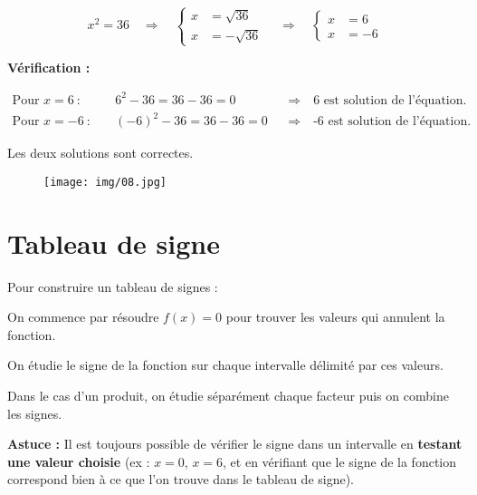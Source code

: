 \documentclass[a4paper,12pt]{article}
\begin{document}
\begin{tcolorbox}[colback=blue!5!white, colframe=blue!75!black, title=Méthode, breakable]
\[
x^2 = 36 \quad \Rightarrow \quad
\left\{
\begin{aligned}
x &= \sqrt{36} \\
x &= -\sqrt{36}
\end{aligned}
\right.
\quad \Rightarrow \quad
\left\{
\begin{aligned}
x &= 6 \\
x &= -6
\end{aligned}
\right.
\]
    
    \textbf{Vérification :}
    
    \begin{align*}
        \text{Pour } x = 6\ :\quad & 6^2 - 36 = 36 - 36 = 0 &&\Rightarrow\quad \text{6 est solution de l'équation.} \\
        \text{Pour } x = -6\ :\quad & (-6)^2 - 36 = 36 - 36 = 0 &&\Rightarrow\quad \text{-6 est solution de l'équation.}
    \end{align*}
    
    Les deux solutions sont correctes.
    
    \end{tcolorbox}
    
    \begin{figure}[H]
        \centering
        \texttt{[image: img/08.jpg]}
      \end{figure}

\section*{Tableau de signe}

\begin{tcolorbox}[colback=blue!5!white, colframe=blue!75!black, title=Méthode – Tableaux de signes]
    Pour construire un tableau de signes :
    \begin{compactitem}
        \item On commence par résoudre $f(x) = 0$ pour trouver les valeurs qui annulent la fonction.
        \item On étudie le signe de la fonction sur chaque intervalle délimité par ces valeurs.
        \item Dans le cas d'un produit, on étudie séparément chaque facteur puis on combine les signes.
    \end{compactitem}
    
    \textbf{Astuce :} Il est toujours possible de vérifier le signe dans un intervalle en \textbf{testant une valeur choisie} (ex : \(x = 0\), \(x = 6\), et en vérifiant que le signe de la fonction correspond bien à ce que l'on trouve dans le tableau de signe).
    \end{tcolorbox}
    
\end{document}
